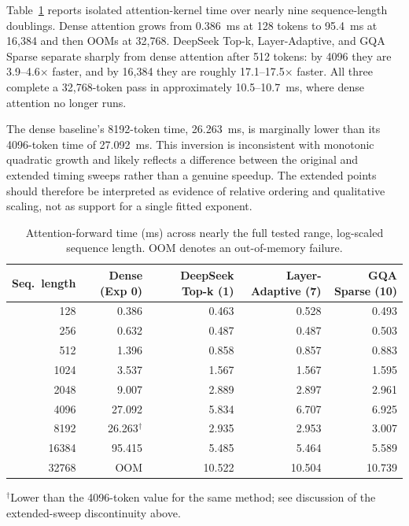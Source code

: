 \documentclass[11pt]{article}
\begin{document}
Table~\ref{tab:loglog} reports isolated attention-kernel time over nearly nine
sequence-length doublings. Dense attention grows from 0.386~ms at 128 tokens
to 95.4~ms at 16{,}384 and then OOMs at 32{,}768. DeepSeek Top-k,
Layer-Adaptive, and GQA Sparse separate sharply from dense attention after 512
tokens: by 4096 they are 3.9--4.6$\times$ faster, and by 16{,}384 they are
roughly 17.1--17.5$\times$ faster. All three complete a 32{,}768-token pass in
approximately 10.5--10.7~ms, where dense attention no longer runs.

The dense baseline's 8192-token time, 26.263~ms, is marginally lower than its
4096-token time of 27.092~ms. This inversion is inconsistent with monotonic
quadratic growth and likely reflects a difference between the original and
extended timing sweeps rather than a genuine speedup. The extended points
should therefore be interpreted as evidence of relative ordering and
qualitative scaling, not as support for a single fitted exponent.

\begin{table}[ht]
  \centering
  \small
  \caption{Attention-forward time (ms) across nearly the full tested range,
  log-scaled sequence length. OOM denotes an out-of-memory failure.}
  \label{tab:loglog}
  \begin{tabular}{@{}rrrrr@{}}
    \toprule
    Seq.\ length & Dense (Exp 0) & DeepSeek Top-k (1) & Layer-Adaptive (7) & GQA Sparse (10) \\
    \midrule
    128    & 0.386 & 0.463 & 0.528 & 0.493 \\
    256    & 0.632 & 0.487 & 0.487 & 0.503 \\
    512    & 1.396 & 0.858 & 0.857 & 0.883 \\
    1024   & 3.537 & 1.567 & 1.567 & 1.595 \\
    2048   & 9.007 & 2.889 & 2.897 & 2.961 \\
    4096   & 27.092 & 5.834 & 6.707 & 6.925 \\
    8192   & 26.263$^\dagger$ & 2.935 & 2.953 & 3.007 \\
    16384  & 95.415 & 5.485 & 5.464 & 5.589 \\
    32768  & OOM & 10.522 & 10.504 & 10.739 \\
    \bottomrule
  \end{tabular}

  \vspace{4pt}
  \raggedright\footnotesize $^\dagger$Lower than the 4096-token value for the
  same method; see discussion of the extended-sweep discontinuity above.
\end{table}
\end{document}
